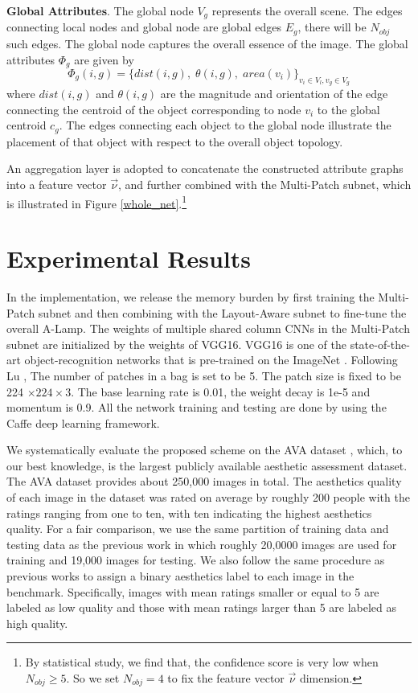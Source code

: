 \documentclass[10pt,twocolumn,letterpaper]{article}
\begin{document}
	\textbf{Global Attributes}. The global node $V_{g}$ represents the overall scene. The edges connecting local nodes and global node are global edges $E_{g}$, there will be $N_{obj}$ such edges.
	The global node captures the overall essence of the image. The global attributes ${\Phi_{g}}$ are given by
	\begin{equation}
	{\Phi _g}(i,g) = {\{ dist(i,g),\;\theta (i,g),\;area({v_i})\} _{{v_i} \in {V_l},{v_g} \in {V_g}}}
	\end{equation}
	where $dist(i,g)$ and $\theta (i,g)$ are the magnitude and orientation of the edge connecting the centroid of the object corresponding to node $v_i$ to the global centroid $c_g$. The edges connecting each object to the global node illustrate the placement of that object with respect to the overall object topology. 
	
	An aggregation layer is adopted to concatenate the constructed attribute graphs into a feature vector ${\vec \nu }$, and further combined with the Multi-Patch subnet, which is illustrated in Figure \ref{whole_net}.\footnote[2]{By statistical study, we find that, the confidence score is very low when ${N_{obj}} \ge 5$. So we set $N_{obj} = 4$ to fix the feature vector ${\vec \nu }$ dimension.} 
	
	\section{Experimental Results} \label{experiments}
	In the implementation, we release the memory burden by first training the Multi-Patch subnet and then combining with the Layout-Aware subnet to fine-tune the overall A-Lamp. The weights of multiple shared column CNNs in the Multi-Patch subnet are initialized by the weights of VGG16. VGG16 is one of the state-of-the-art object-recognition networks that is pre-trained on the ImageNet \cite{Alex:2012:NIPS:ImageNet}.  
	Following Lu \cite{Lu:2015:ICCV}, The number of patches in a bag is set to be 5. The patch size is fixed to be 224 $ \times 224 \times 3$. The base learning rate is 0.01, the weight decay is 1e-5 and momentum is 0.9.  
	All the network training and testing are done by using the Caffe deep learning framework\cite{Jia:2014:ACMMM:caffe}. 
	
	We systematically evaluate the proposed scheme on the AVA dataset \cite{Murray:MMP2012:AVA}, which, to our best knowledge, is the largest publicly available aesthetic assessment dataset. The AVA dataset provides about 250,000 images in total. The aesthetics quality of each image in the dataset was rated on average by roughly 200 people with the ratings ranging from one to ten, with ten indicating the highest aesthetics quality. For a fair comparison, we use the same partition of training data and testing data as the previous
	work \cite{Lu:2014:ACMMM,Lu:2015:ICCV,Mai:2016:CVPR,Murray:MMP2012:AVA} in which roughly 20,0000 images are used for training and 19,000 images for testing. We also follow the same procedure as previous works to assign a binary aesthetics label to each image in the benchmark. Specifically, images with mean ratings smaller or equal to 5 are labeled as low quality and those with mean ratings larger than 5 are labeled as high quality.
	
\end{document}
